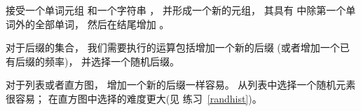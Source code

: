 
 接受一个单词元组  和一个字符串  ，
并形成一个新的元组， 其具有  中除第一个单词外的全部单词，
然后在结尾增加  。


对于后缀的集合， 我们需要执行的运算包括增加一个新的后缀
(或者增加一个已有后缀的频率)， 并选择一个随机后缀。


对于列表或者直方图， 增加一个新的后缀一样容易。
从列表中选择一个随机元素很容易；
在直方图中选择的难度更大(见 练习~\ref{randhist})。


